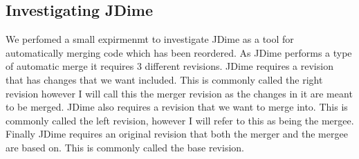 \subsection{Investigating JDime}
We perfomed a small expirmenmt to investigate JDime as a tool for automatically merging code which has been reordered.
% 
% 
As JDime performs a type of automatic merge it requires 3 different revisions.
JDime requires a revision that has changes that we want included.  This is commonly called the right revision however I will call this the merger revision as the changes in it are meant to be merged.
JDime also requires a revision that we want to merge into.  This is commonly called the left revision, however I will refer to this as being the mergee. 
Finally JDime requires an original revision that both the merger and the mergee are based on.
This is commonly called the base revision.

